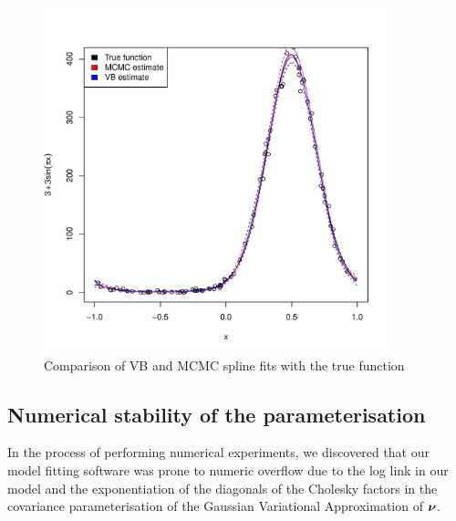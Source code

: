 \documentclass{amsart}[12pt]
\begin{document}
					
			\begin{figure}
				\label{fig:spline}
				\caption{Comparison of VB and MCMC spline fits with the true function}
				\includegraphics[width=100mm, height=100mm]{code/results/accuracy_plots_spline_gva2.pdf}
			\end{figure}
					
					
			\subsection{Numerical stability of the parameterisation}
			
			In the process of performing numerical experiments, we discovered that our model fitting software was 
			prone to numeric overflow due to the log link in our model and the exponentiation of the diagonals of the
			Cholesky factors in the covariance parameterisation of the Gaussian Variational Approximation of ${\boldsymbol \nu}$.
			
\end{document}
